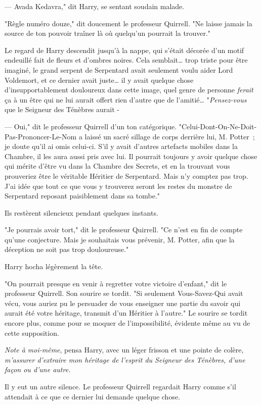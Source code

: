 --- Avada Kedavra," dit Harry, se sentant soudain malade.

"Règle numéro douze," dit doucement le professeur Quirrell. "Ne laisse jamais la source de ton pouvoir traîner là où quelqu'un pourrait la trouver."

Le regard de Harry descendit jusqu'à la nappe, qui s'était décorée d'un motif endeuillé fait de fleurs et d'ombres noires. Cela semblait… trop triste pour être imaginé, le grand serpent de Serpentard avait seulement voulu aider Lord Voldemort, et ce dernier avait juste… il y avait quelque chose d'insupportablement douloureux dans cette image, quel genre de personne \emph{ferait} ça à un être qui ne lui aurait offert rien d'autre que de l'amitié… "\emph{Pensez-vous} que le Seigneur des Ténèbres aurait -

--- Oui," dit le professeur Quirrell d'un ton catégorique. "Celui-Dont-On-Ne-Doit-Pas-Prononcer-Le-Nom a laissé un sacré sillage de corps derrière lui, M. Potter~; je doute qu'il ai omis celui-ci. S'il y avait d'autres artefacts mobiles dans la Chambre, il les aura aussi pris avec lui. Il pourrait toujours y avoir quelque chose qui mérite d'être vu dans la Chambre des Secrets, et en la trouvant vous prouveriez être le véritable Héritier de Serpentard. Mais n'y comptez pas trop. J'ai idée que tout ce que vous y trouverez seront les restes du monstre de Serpentard reposant paisiblement dans sa tombe."

Ils restèrent silencieux pendant quelques instants.

"Je pourrais avoir tort," dit le professeur Quirrell. "Ce n'est en fin de compte qu'une conjecture. Mais je souhaitais vous prévenir, M. Potter, afin que la déception ne soit pas trop douloureuse."

Harry hocha légèrement la tête.

"On pourrait presque en venir à regretter votre victoire d'enfant," dit le professeur Quirrell. Son sourire se tordit. "Si seulement Vous-Savez-Qui avait vécu, vous auriez pu le persuader de vous enseigner une partie du savoir qui aurait été votre héritage, transmit d'un Héritier à l'autre." Le sourire se tordit encore plus, comme pour se moquer de l'impossibilité, évidente même au vu de cette supposition.

\emph{Note à moi-même}, pensa Harry, avec un léger frisson et une pointe de colère, \emph{m'assurer d'extraire mon héritage de l'esprit du Seigneur des Ténèbres, d'une façon ou d'une autre.}

Il y eut un autre silence. Le professeur Quirrell regardait Harry comme s'il attendait à ce que ce dernier lui demande quelque chose.

